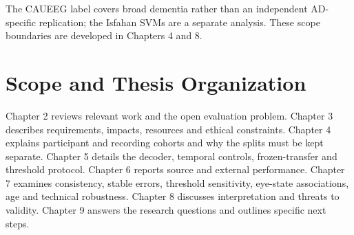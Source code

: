 The CAUEEG label covers broad dementia rather than an independent AD-specific replication; the Isfahan SVMs are a separate analysis. These scope boundaries are developed in Chapters 4 and 8.

\section{Scope and Thesis Organization}
Chapter 2 reviews relevant work and the open evaluation problem. Chapter 3 describes requirements, impacts, resources and ethical constraints. Chapter 4 explains participant and recording cohorts and why the splits must be kept separate. Chapter 5 details the decoder, temporal controls, frozen-transfer and threshold protocol. Chapter 6 reports source and external performance. Chapter 7 examines consistency, stable errors, threshold sensitivity, eye-state associations, age and technical robustness. Chapter 8 discusses interpretation and threats to validity. Chapter 9 answers the research questions and outlines specific next steps.
